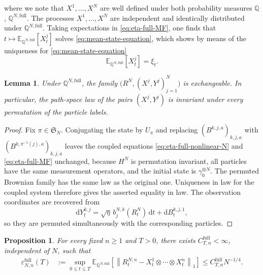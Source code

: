 \documentclass[10pt,a4paper,reqno]{amsart}
\numberwithin{equation}{section}
\theoremstyle{plain}
\newtheorem{proposition}[theorem]{Proposition}
\newtheorem{lemma}[theorem]{Lemma}
\theoremstyle{definition}
\theoremstyle{remark}
\renewcommand{\d}{\mathrm d}
\newcommand{\E}{\mathbb E}
\newcommand{\Q}{\mathbb Q}
\newcommand{\1}{\mathbf 1}
\begin{document}
where we note that  \(X^1,\ldots,X^N\) are well defined under both probability measures $\Q$,  
$\Q^{N,\mathrm{full}}$.  
The processes \(X^1,\ldots,X^N\) are independent and identically
distributed under \(\Q^{N,\mathrm{full}}\).  Taking expectations in
\eqref{eq:eta-full-MF},  one finds that  $t\longmapsto  \E_{\Q^{N,\mathrm{full}}}[X_t^j]$ solves \eqref{eq:mean-state-equation},  which shows by means of the uniqueness for
\eqref{eq:mean-state-equation} 
\begin{equation}
  \E_{\Q^{N,\mathrm{full}}}[X_t^j]
  =
  \xi_t.
  \label{eq:eta-full-MF-mean}
\end{equation}

\begin{lemma}
\label{lem:eta-full-exchangeability}
Under $\Q^{N,\mathrm{full}}$, the family
\(
  \bigl(R^N,(X^j,Y^j)_{j=1}^N\bigr)
\)
is exchangeable.  In particular, the path-space law
of the pairs $(X^j,Y^j)$ is invariant under every permutation of the
particle labels.
\end{lemma}

\begin{proof}
Fix $\pi\in\mathfrak S_N$.  Conjugating the state by $U_\pi$ and replacing
$(B^{k,j,a})_{k,j,a}$ with
$(B^{k,\pi^{-1}(j),a})_{k,j,a}$ leaves the coupled equations
\eqref{eq:eta-full-nonlinear-N} and \eqref{eq:eta-full-MF} unchanged,
because $H^N$ is permutation invariant, all particles have the same
measurement operators, and the initial state is
$\gamma_0^{\otimes N}$.  The permuted Brownian family has the same law as
the original one.  Uniqueness in law for the coupled system therefore gives
the asserted equality in law.  The observation coordinates are recovered
from
\[
  \d Y_t^{k,j}
  =
  \sqrt{\eta}\,b_j^{N,k}(R_t^N)\,\d t
  +\d B_t^{k,j,1},
\]
so they are permuted simultaneously with the corresponding particles.
\end{proof}

\begin{proposition}
\label{prop:eta-full-chaos}
For every fixed \(n\ge1\) and \(T>0\), there exists
\(C_{T,n}^{\mathrm{full}}<\infty\), independent of \(N\), such that
\begin{equation}
\begin{aligned}
  \varepsilon_{N,n}^{\mathrm{full}}(T)
  &:={}
  \sup_{0\le t\le T}
  \E_{\Q^{N,\mathrm{full}}}
  \left[
    \left\|
      R_t^{N:n}
      -
      X_t^1\otimes\cdots\otimes X_t^n
    \right\|_1
  \right] \le
  C_{T,n}^{\mathrm{full}}N^{-1/4}.
\end{aligned}
  \label{eq:eta-full-chaos}
\end{equation}
\end{proposition}
\end{document}
